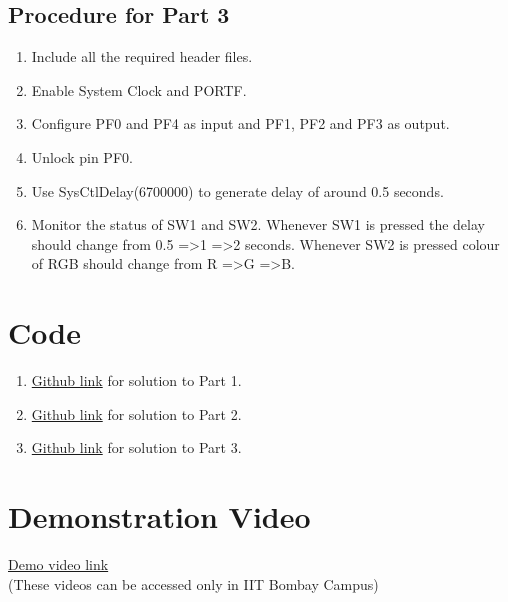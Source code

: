\documentclass[a4paper,12pt,oneside]{book}
\begin{document}
\subsection{Procedure for Part 3}
\begin{enumerate}
\item Include all the required header files.
\item Enable System Clock and PORTF.
\item Configure PF0 and PF4 as input and PF1, PF2 and PF3 as output.
\item Unlock pin PF0.
\item Use SysCtlDelay(6700000) to generate delay of around 0.5 seconds.
\item Monitor the status of SW1 and SW2. Whenever SW1 is pressed the delay should change from 0.5 =\textgreater 1 =\textgreater 2 seconds. Whenever SW2 is pressed colour of RGB should change from R =\textgreater G =\textgreater B.
\end{enumerate}

\section{Code}
\begin{enumerate}
\item \href{https://github.com/eYSIP-2016/eYSIP-2016-Around-the-world-of-Embedded-Systems/blob/origin/master/Solutions/lab1\%20solutions/lab_1-problem1.c}{Github link} for solution to Part 1.
\item \href{https://github.com/eYSIP-2016/eYSIP-2016-Around-the-world-of-Embedded-Systems/blob/origin/master/Solutions/lab1\%20solutions/lab_1-problem\%202.c}{Github link} for solution to Part 2.
\item \href{https://github.com/eYSIP-2016/eYSIP-2016-Around-the-world-of-Embedded-Systems/blob/origin/master/Solutions/lab1\%20solutions/lab_1-problem3.c}{Github link} for solution to Part 3.
\end{enumerate}

\section{Demonstration Video}

\href{http://10.129.139.139/videos/Lab1.html}{Demo video link} \\
(These videos can be accessed only in IIT Bombay Campus)
\end{document}

